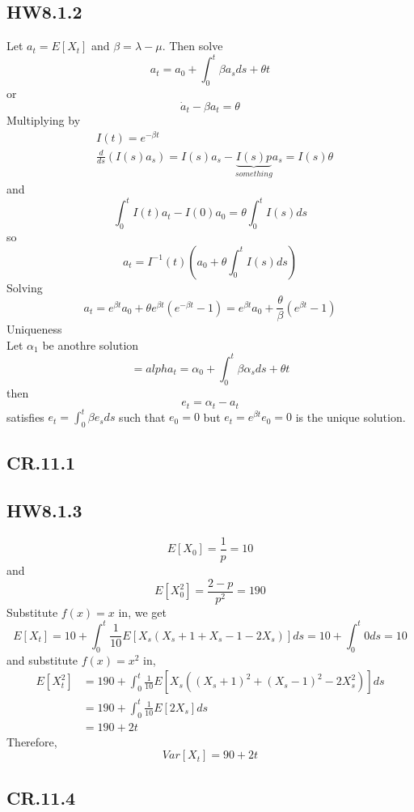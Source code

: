 \documentclass[11pt]{article}
\begin{document}
\subsection{HW8.1.2}  
Let $a_t = E[X_t]$ and $\beta = \lambda - \mu$. Then solve
\[
    a_t = a_0 + \int_0^t \beta a_s ds + \theta t     
\]
or 
\[
    \dot{a}_t - \beta a_t = \theta    
\]
Multiplying by
\begin{equation*}
    \begin{aligned}
            &I(t) = e^{-\beta t} \\
    &\frac{d}{ds} \left(I(s) a_s \right) = I(s) a_s - \underbrace{I(s)p}_{something}a_s = I(s) \theta
    \end{aligned}
\end{equation*}
and 
\[
    \int_0^t I(t) a_t -I(0)a_0 = \theta \int_0^t I(s) ds   
\]
so 
\[
    a_t = I^{-1}(t) (a_0 + \theta \int_0^t I(s)ds)    
\]
Solving 
\[
    a_t = e^{\beta t}a_0 + \theta e^{\beta t}(e^{-\beta t}-1) = e^{\beta t}a_0 + \frac{\theta}{\beta}(e^{\beta t }-1)
\]
Uniqueness \\
Let $\alpha_1$ be anothre solution
\[
    =alpha_t = \alpha_0 + \int_0^t \beta \alpha_s ds + \theta t     
\]
then 
\[
    e_t = \alpha_t - a_t    
\]
satisfies $ e_t = \int_0^t \beta e_s ds$ such that $e_0 = 0$ but $e_t = e^{\beta t}e_0 = 0$ is the unique solution.
\subsection{CR.11.1}
\subsection{HW8.1.3}
\[
    E[X_0] = \frac{1}{p} = 10    
\]
and 
\[
    E[X_0^2] = \frac{2-p}{p^2} = 190    
\]
Substitute $f(x) = x$ in, we get 
\[
    E[X_t]  = 10 + \int_0^t \frac{1}{10}E[X_s(X_s+1 + X_s - 1 -2X_s)]ds = 10 + \int_0^t 0ds = 10 
\]
and substitute $f(x) = x^2$ in, 
\begin{equation*}
    \begin{aligned}
        E[X_t^2] &= 190 + \int_0^t \frac{1}{10} E[X_s((X_s+1)^2 + (X_s-1)^2 -2X_s^2)] ds \\
        &= 190 + \int_0^t \frac{1}{10} E[2X_s] ds \\
        &= 190+2t
    \end{aligned}
\end{equation*}
Therefore, 
\[
    Var[X_t] = 90+2t
\]
\subsection{CR.11.4}
\end{document}
